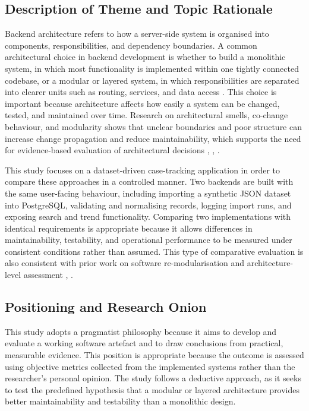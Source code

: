 \documentclass[conference]{IEEEtran}
\begin{document}
\subsection{Description of Theme and Topic Rationale}
Backend architecture refers to how a server-side system is organised into components, responsibilities, and dependency boundaries. A common architectural choice in backend development is whether to build a monolithic system, in which most functionality is implemented within one tightly connected codebase, or a modular or layered system, in which responsibilities are separated into clearer units such as routing, services, and data access \cite{b5}. This choice is important because architecture affects how easily a system can be changed, tested, and maintained over time. Research on architectural smells, co-change behaviour, and modularity shows that unclear boundaries and poor structure can increase change propagation and reduce maintainability, which supports the need for evidence-based evaluation of architectural decisions \cite{b1}, \cite{b3}, \cite{b4}.

This study focuses on a dataset-driven case-tracking application in order to compare these approaches in a controlled manner. Two backends are built with the same user-facing behaviour, including importing a synthetic JSON dataset into PostgreSQL, validating and normalising records, logging import runs, and exposing search and trend functionality. Comparing two implementations with identical requirements is appropriate because it allows differences in maintainability, testability, and operational performance to be measured under consistent conditions rather than assumed. This type of comparative evaluation is also consistent with prior work on software re-modularisation and architecture-level assessment \cite{b4}, \cite{b7}.

\subsection{Positioning and Research Onion}
This study adopts a pragmatist philosophy because it aims to develop and evaluate a working software artefact and to draw conclusions from practical, measurable evidence. This position is appropriate because the outcome is assessed using objective metrics collected from the implemented systems rather than the researcher’s personal opinion. The study follows a deductive approach, as it seeks to test the predefined hypothesis that a modular or layered architecture provides better maintainability and testability than a monolithic design.
\end{document}
